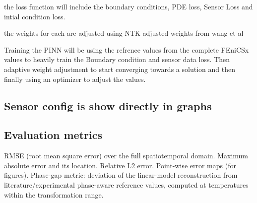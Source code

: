 \documentclass[12pt, a4paper]{article}
\begin{document}
the loss function will include the boundary conditions, PDE loss, Sensor Loss and intial condition loss. 

the weights for each are adjusted using NTK-adjusted weights from wang et al

Training the PINN will be using the refrence values from the complete FEniCSx values to heavily train the Boundary condition and sensor data loss. Then adaptive weight adjustment to start converging towards a solution and then finally using an optimizer to adjust the values. 

\subsection{Sensor config is show directly in graphs }


\subsection{Evaluation metrics}
RMSE (root mean square error) over the full spatiotemporal domain. Maximum absolute error and its location. Relative L2 error. Point-wise error maps (for figures).
 Phase-gap metric: deviation of the linear-model reconstruction from literature/experimental phase-aware reference values, computed at temperatures within the transformation range.
    

    
\end{document}
